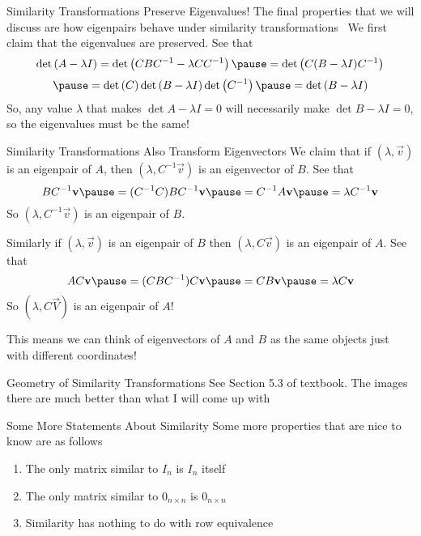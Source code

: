 \documentclass[xcoler=dvipsnames, aspectratio=169]{beamer}
\begin{document}
    \begin{frame}{Similarity Transformations Preserve Eigenvalues!}
        The final properties that we will discuss are how eigenpairs behave under similarity transformations
        \pause\
        We first claim that the eigenvalues are preserved. See that
        \[
            \det{A-\lambda I} = \det{CBC^{-1} -\lambda CC^{-1}}\pause = \det{C(B-\lambda I)C^{-1}}
        \]
        \vspace{-20pt}
        \[
            \pause = \det{C}\det{B-\lambda I}\det{C^{-1}}\pause = \det{B-\lambda I}
        \]\pause
        So, any value $\lambda$ that makes $\det{A-\lambda I}=0$ will necessarily make 
        $\det{B-\lambda I}=0$, so the eigenvalues must be the same!
    \end{frame}
    \begin{frame}{Similarity Transformations Also Transform Eigenvectors}
        We claim that if $(\lambda,\vec{v})$ is an eigenpair of $A$, 
        then $(\lambda, C^{-1}\vec{v})$ is an eigenvector of $B$. See that
        \[
            BC^{-1}\vec{v}\pause = (C^{-1}C)BC^{-1}\vec{v}\pause = C^{-1}A\vec{v}\pause = 
            \lambda C^{-1}\vec{v}
        \]\pause
        So $(\lambda,C^{-1}\vec{v})$ is an eigenpair of $B$.\pause\

        Similarly if $(\lambda,\vec{v})$ is an eigenpair of $B$ then $(\lambda,C\vec{v})$ is an eigenpair
        of $A$. See that\pause
        \[
            AC\vec{v}\pause = (CBC^{-1})C\vec{v}\pause = CB\vec{v}\pause = \lambda C\vec{v}
        \]\pause
        So $(\lambda,C\vec{V})$ is an eigenpair of $A$!\pause\

        This means we can think of eigenvectors of $A$ and $B$ as the same objects just with different
        coordinates!
    \end{frame}
    \begin{frame}{Geometry of Similarity Transformations}
        See Section 5.3 of textbook. The images there are much better than what I will come up with
    \end{frame}
    \begin{frame}{Some More Statements About Similarity}
        Some more properties that are nice to know are as follows
        \begin{enumerate}
            \pause\item The only matrix similar to $I_n$ is $I_n$ itself
            \pause\item The only matrix similar to $0_{n\times n}$ is $0_{n\times n}$
            \pause\item Similarity has nothing to do with row equivalence
        \end{enumerate}
    \end{frame}
\end{document}
